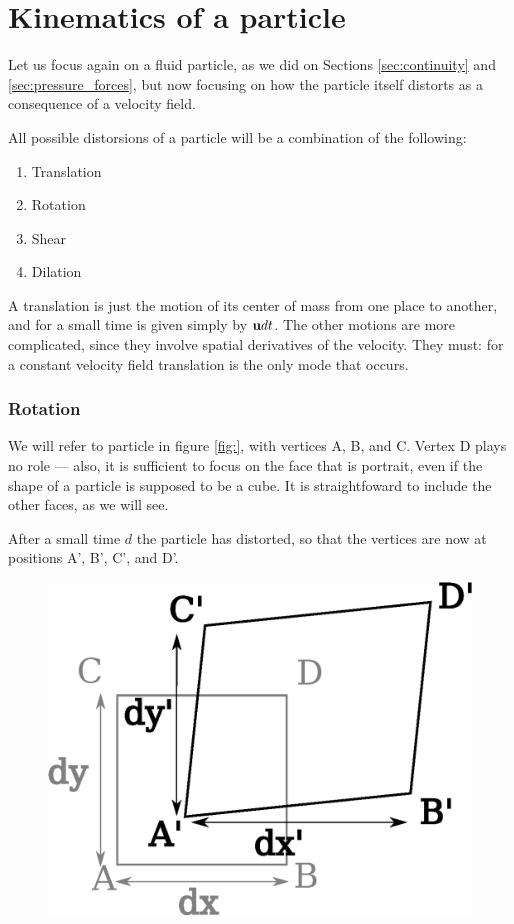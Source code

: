 \section{Kinematics of a particle}

\label{sec:particle}

Let us focus again on a fluid particle, as we did on Sections
\ref{sec:continuity} and \ref{sec:pressure_forces}, but now focusing
on how the particle itself distorts as a consequence of a velocity
field.

All possible distorsions of a particle will be a combination of the
following:
\begin{enumerate}
 \item Translation
 \item Rotation
 \item Shear
 \item Dilation
\end{enumerate}

A translation is just the motion of its center of mass from one place
to another, and for a small time is given simply by $\mathbf{u} dt$. The
other motions are more complicated, since they involve spatial
derivatives of the velocity. They must: for a constant velocity field
translation is the only mode that occurs.

\subsubsection{Rotation}

We will refer to particle in figure \ref{fig:}, with vertices A, B,
and C. Vertex D plays no role --- also, it is sufficient to focus on
the face that is portrait, even if the shape of a particle is supposed
to be a cube. It is straightfoward to include the other faces, as we
will see.

After a small time $d$ the particle has distorted, so that the
vertices are now at positions A', B', C', and D'.

\begin{figure}
  \centering
  \includegraphics[width=0.4\linewidth]{figures/particle0}
  \caption{\label{fig:particle0}}
\end{figure}



